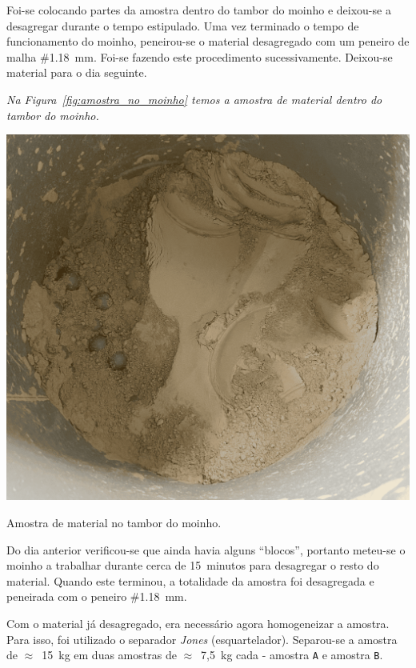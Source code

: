 Foi-se colocando partes da amostra dentro do tambor do moinho e deixou-se a desagregar durante o tempo estipulado.
Uma vez terminado o tempo de funcionamento do moinho, peneirou-se o material desagregado com um peneiro de malha \#1.18~mm.
Foi-se fazendo este procedimento sucessivamente.
Deixou-se material para o dia seguinte.

\hrulefill



\textit{Na Figura~\ref{fig:amostra_no_moinho} temos a amostra de material dentro do tambor do moinho.}

\begin{marginfigure}[4\baselineskip]
    \includegraphics[width=0.9\linewidth]{figures/amostra_no_moinho}
    \caption{Amostra de material no tambor do moinho.}
    \label{fig:amostra_no_moinho}
\end{marginfigure}

Do dia anterior verificou-se que ainda havia alguns ``blocos'', portanto meteu-se o moinho a trabalhar durante cerca de 15~minutos para desagregar o resto do material.
Quando este terminou, a totalidade da amostra foi desagregada e peneirada com o peneiro \#1.18~mm.

Com o material já desagregado, era necessário agora homogeneizar a amostra.
Para isso, foi utilizado o separador \emph{Jones} (esquartelador).
Separou-se a amostra de $\approx$~15~kg em duas amostras de $\approx$~7,5~kg cada - amostra \texttt{A} e amostra \texttt{B}\@.

